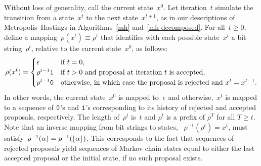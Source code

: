 \documentclass[angelino.tex]{subfiles}
\begin{document}
Without loss of generality, call the current state~$x^0$.
Let iteration~$t$ simulate the transition from a state~$x^t$ to the next 
state~$x^{t+1}$, as in our descriptions of Metropolis--Hastings in
Algorithms~\ref{mh} and~\ref{mh-decomposed}.
For all~$t \ge 0$, define a mapping~$\rho(x^t) \equiv \rho^t$
that identifies with each possible state~$x^t$ a bit string~$\rho^t$,
relative to the current state~$x^0$, as follows:
%
\[ \rho(x^t) = \begin{cases}
   \epsilon & \text{if $t=0$,} \\
   \rho^{t-1}\texttt{1} & \text{if $t>0$ and proposal at iteration $t$ is accepted,}  \\
   \rho^{t-1}\texttt{0} & \text{otherwise, in which case the proposal is rejected and $x^t = x^{t-1}$.}
  \end{cases} \]
%
In other words, the current state~$x^0$ is mapped to~$\epsilon$ and
otherwise,~$x^t$ is mapped to a sequence of $\texttt{0}$'s and $\texttt{1}$'s
corresponding to its history of rejected and accepted proposals, respectively.
The length of~$\rho^t$ is~$t$ and $\rho^t$ is a prefix of
$\rho^T$ for all $T \geq t$.
Note that an inverse mapping from bit strings to states, 
\ie~$\rho^{-1}(\rho^t) = x^t$,
must satisfy~$\rho^{-1}(\alpha) = \rho^{-1}({\lfloor\alpha\rfloor})$.
This corresponds to the fact that sequences of rejected proposals yield
sequences of Markov chain states equal to either the last accepted proposal
or the initial state, if no such proposal exists.


\end{document}
